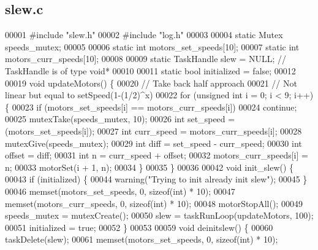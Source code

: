 \subsection{slew.\+c}
\label{a00143_source}

\begin{DoxyCode}
00001 \textcolor{preprocessor}{#include "slew.h"}
00002 \textcolor{preprocessor}{#include "log.h"}
00003 
00004 \textcolor{keyword}{static} Mutex speeds_mutex;
00005 
00006 \textcolor{keyword}{static} \textcolor{keywordtype}{int} motors_set_speeds[10];
00007 \textcolor{keyword}{static} \textcolor{keywordtype}{int} motors_curr_speeds[10];
00008 
00009 \textcolor{keyword}{static} TaskHandle slew = NULL; \textcolor{comment}{// TaskHandle is of type void*}
00010 
00011 \textcolor{keyword}{static} \textcolor{keywordtype}{bool} initialized = \textcolor{keyword}{false};
00012 
00019 \textcolor{keywordtype}{void} updateMotors() \{
00020   \textcolor{comment}{// Take back half approach}
00021   \textcolor{comment}{// Not linear but equal to setSpeed(1-(1/2)^x)}
00022   \textcolor{keywordflow}{for} (\textcolor{keywordtype}{unsigned} \textcolor{keywordtype}{int} i = 0; i < 9; i++) \{
00023     \textcolor{keywordflow}{if} (motors_set_speeds[i] == motors_curr_speeds[i])
00024       \textcolor{keywordflow}{continue};
00025     mutexTake(speeds_mutex, 10);
00026     \textcolor{keywordtype}{int} set\_speed = (motors_set_speeds[i]);
00027     \textcolor{keywordtype}{int} curr\_speed = motors_curr_speeds[i];
00028     mutexGive(speeds_mutex);
00029     \textcolor{keywordtype}{int} diff = set\_speed - curr\_speed;
00030     \textcolor{keywordtype}{int} offset = diff;
00031     \textcolor{keywordtype}{int} n = curr\_speed + offset;
00032     motors_curr_speeds[i] = n;
00033     motorSet(i + 1, n);
00034   \}
00035 \}
00036 
00042 \textcolor{keywordtype}{void} init_slew() \{
00043   \textcolor{keywordflow}{if} (initialized) \{
00044     warning(\textcolor{stringliteral}{"Trying to init already init slew"});
00045   \}
00046   memset(motors_set_speeds, 0, \textcolor{keyword}{sizeof}(\textcolor{keywordtype}{int}) * 10);
00047   memset(motors_curr_speeds, 0, \textcolor{keyword}{sizeof}(\textcolor{keywordtype}{int}) * 10);
00048   motorStopAll();
00049   speeds_mutex = mutexCreate();
00050   slew = taskRunLoop(updateMotors, 100);
00051   initialized = \textcolor{keyword}{true};
00052 \}
00053 
00059 \textcolor{keywordtype}{void} deinitslew() \{
00060   taskDelete(slew);
00061   memset(motors_set_speeds, 0, \textcolor{keyword}{sizeof}(\textcolor{keywordtype}{int}) * 10);

\end{DoxyCode}
